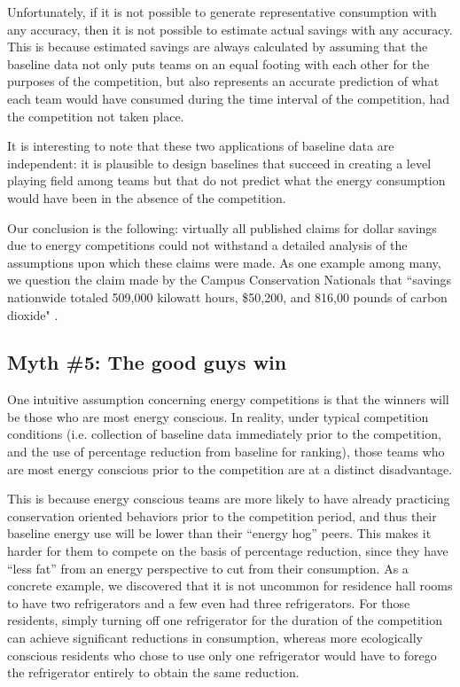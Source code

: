 \documentclass[jou]{apa} %
\begin{document}
Unfortunately, if it is not possible to generate representative consumption with any
accuracy, then it is not possible to estimate actual savings with any accuracy.  This is
because estimated savings are always calculated by assuming that the baseline data not
only puts teams on an equal footing with each other for the purposes of the competition,
but also represents an accurate prediction of what each team would have consumed during
the time interval of the competition, had the competition not taken place.  

It is interesting to note that these two applications of baseline data are
independent: it is plausible to design baselines that succeed in creating a
level playing field among teams but that do not predict what the energy
consumption would have been in the absence of the competition.

Our conclusion is the following: virtually all published claims for dollar savings due to
energy competitions could not withstand a detailed analysis of the assumptions upon which
these claims were made.  As one example among many, we question the claim made by
the Campus Conservation Nationals that ``savings nationwide totaled 509,000 kilowatt
hours, \$50,200, and 816,00 pounds of carbon dioxide" \cite{Willens2010}.

\subsection{Myth \#5: The good guys win}

One intuitive assumption concerning energy competitions is that the winners will be those
who are most energy conscious.  In reality, under typical competition conditions
(i.e. collection of baseline data immediately prior to the competition, and the use of
percentage reduction from baseline for ranking), those teams who are most energy conscious
prior to the competition are at a distinct disadvantage.

This is because energy conscious teams are more likely to have already practicing 
conservation oriented behaviors prior to the competition period, and thus
their baseline energy use will be lower than their ``energy hog'' peers.  This makes it
harder for them to compete on the basis of percentage reduction, since they have ``less
fat'' from an energy perspective to cut from their consumption.  As a concrete example, we
discovered that it is not uncommon for residence hall rooms to have two refrigerators and
a few even had three refrigerators. For those residents, simply turning off one
refrigerator for the duration of the competition can achieve significant reductions in
consumption, whereas more ecologically conscious residents who chose to use only one
refrigerator would have to forego the refrigerator entirely to obtain the same reduction.
\end{document}
